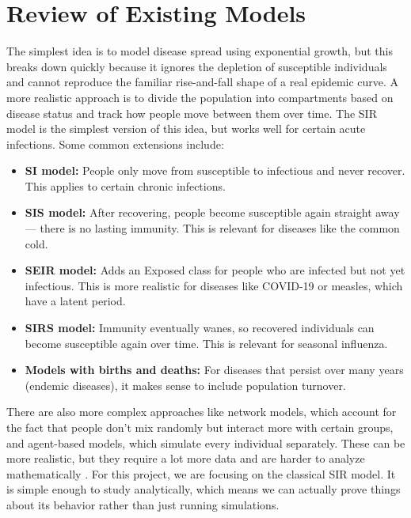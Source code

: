 \documentclass[11pt]{article}
\begin{document}
\section{Review of Existing Models}

The simplest idea is to model disease spread using exponential growth, but this breaks down quickly because it ignores the depletion of susceptible individuals and cannot reproduce the familiar rise-and-fall shape of a real epidemic curve. A more realistic approach is to divide the population into compartments based on disease status and track how people move between them over time. The SIR model is the simplest version of this idea, but works well for certain acute infections\cite{keeling2011, hethcote2000}. Some common extensions include:

\begin{itemize}
    \item \textbf{SI model:} People only move from susceptible to infectious and never recover. This applies to certain chronic infections.
    \item \textbf{SIS model:} After recovering, people become susceptible again straight away --- there is no lasting immunity. This is relevant for diseases like the common cold.
    \item \textbf{SEIR model:} Adds an Exposed class for people who are infected but not yet infectious. This is more realistic for diseases like COVID-19 or measles, which have a latent period.
    \item \textbf{SIRS model:} Immunity eventually wanes, so recovered individuals can become susceptible again over time. This is relevant for seasonal influenza.
    \item \textbf{Models with births and deaths:} For diseases that persist over many years (endemic diseases), it makes sense to include population turnover.
\end{itemize}

There are also more complex approaches like network models, which account for the fact that people don't mix randomly but interact more with certain groups, and agent-based models, which simulate every individual separately. These can be more realistic, but they require a lot more data and are harder to analyze mathematically  \cite{brauer2012}. For this project, we are focusing on the classical SIR model. It is simple enough to study analytically, which means we can actually prove things about its behavior rather than just running simulations.
\end{document}
